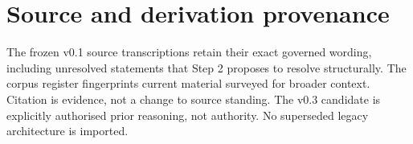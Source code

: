 \chapter{Source and derivation provenance}\label{model:sources}
The frozen v0.1 source transcriptions retain their exact governed wording, including unresolved statements that Step 2 proposes to resolve structurally. The corpus register fingerprints current material surveyed for broader context. Citation is evidence, not a change to source standing. The v0.3 candidate is explicitly authorised prior reasoning, not authority. No superseded legacy architecture is imported.

